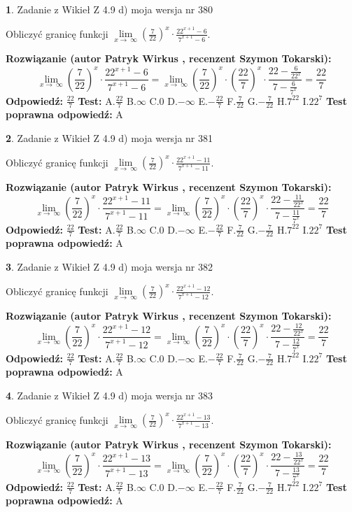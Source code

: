 \documentclass[12pt, a4paper]{article}
\theoremstyle{definition} %
\newtheorem{zad}{}
\newcommand{\zadStart}[1]{\begin{zad}#1\newline}
\newcommand{\zadStop}{\end{zad}}
\newcommand{\rozwStart}[2]{\noindent \textbf{Rozwiązanie (autor #1 , recenzent #2): }\newline}
\newcommand{\rozwStop}{\newline}
\newcommand{\odpStart}{\noindent \textbf{Odpowiedź:}\newline}
\newcommand{\odpStop}{\newline}
\newcommand{\testStart}{\noindent \textbf{Test:}\newline}
\newcommand{\testStop}{\newline}
\newcommand{\kluczStart}{\noindent \textbf{Test poprawna odpowiedź:}\newline}
\newcommand{\kluczStop}{\newline}
\begin{document}
\zadStart{Zadanie z Wikieł Z 4.9 d) moja wersja nr 380}


Obliczyć granicę funkcji  $\lim\limits_{x\to\ \infty}(\frac{7}{22})^{x}\cdot\frac{22^{x+1}-6}{7^{x+1}-6}$.
\zadStop
\rozwStart{Patryk Wirkus}{Szymon Tokarski}
$$\lim\limits_{x\to\ \infty}(\frac{7}{22})^{x}\cdot\frac{22^{x+1}-6}{7^{x+1}-6}=\lim\limits_{x\to\ \infty}(\frac{7}{22})^{x}\cdot(\frac{22}{7})^{x} \cdot \frac{22-\frac{6}{22^{x}}}{7-\frac{6}{7^{x}}} = \frac{22}{7}$$
\rozwStop
\odpStart
$\frac{22}{7}$
\odpStop
\testStart
A.$\frac{22}{7}$ B.$\infty$ C.$0$ D.$-\infty$ E.$-\frac{22}{7}$
F.$\frac{7}{22}$ G.$-\frac{7}{22}$
H.$7^{22}$
I.$22^{7}$
\testStop
\kluczStart
A
\kluczStop



\zadStart{Zadanie z Wikieł Z 4.9 d) moja wersja nr 381}


Obliczyć granicę funkcji  $\lim\limits_{x\to\ \infty}(\frac{7}{22})^{x}\cdot\frac{22^{x+1}-11}{7^{x+1}-11}$.
\zadStop
\rozwStart{Patryk Wirkus}{Szymon Tokarski}
$$\lim\limits_{x\to\ \infty}(\frac{7}{22})^{x}\cdot\frac{22^{x+1}-11}{7^{x+1}-11}=\lim\limits_{x\to\ \infty}(\frac{7}{22})^{x}\cdot(\frac{22}{7})^{x} \cdot \frac{22-\frac{11}{22^{x}}}{7-\frac{11}{7^{x}}} = \frac{22}{7}$$
\rozwStop
\odpStart
$\frac{22}{7}$
\odpStop
\testStart
A.$\frac{22}{7}$ B.$\infty$ C.$0$ D.$-\infty$ E.$-\frac{22}{7}$
F.$\frac{7}{22}$ G.$-\frac{7}{22}$
H.$7^{22}$
I.$22^{7}$
\testStop
\kluczStart
A
\kluczStop



\zadStart{Zadanie z Wikieł Z 4.9 d) moja wersja nr 382}


Obliczyć granicę funkcji  $\lim\limits_{x\to\ \infty}(\frac{7}{22})^{x}\cdot\frac{22^{x+1}-12}{7^{x+1}-12}$.
\zadStop
\rozwStart{Patryk Wirkus}{Szymon Tokarski}
$$\lim\limits_{x\to\ \infty}(\frac{7}{22})^{x}\cdot\frac{22^{x+1}-12}{7^{x+1}-12}=\lim\limits_{x\to\ \infty}(\frac{7}{22})^{x}\cdot(\frac{22}{7})^{x} \cdot \frac{22-\frac{12}{22^{x}}}{7-\frac{12}{7^{x}}} = \frac{22}{7}$$
\rozwStop
\odpStart
$\frac{22}{7}$
\odpStop
\testStart
A.$\frac{22}{7}$ B.$\infty$ C.$0$ D.$-\infty$ E.$-\frac{22}{7}$
F.$\frac{7}{22}$ G.$-\frac{7}{22}$
H.$7^{22}$
I.$22^{7}$
\testStop
\kluczStart
A
\kluczStop



\zadStart{Zadanie z Wikieł Z 4.9 d) moja wersja nr 383}


Obliczyć granicę funkcji  $\lim\limits_{x\to\ \infty}(\frac{7}{22})^{x}\cdot\frac{22^{x+1}-13}{7^{x+1}-13}$.
\zadStop
\rozwStart{Patryk Wirkus}{Szymon Tokarski}
$$\lim\limits_{x\to\ \infty}(\frac{7}{22})^{x}\cdot\frac{22^{x+1}-13}{7^{x+1}-13}=\lim\limits_{x\to\ \infty}(\frac{7}{22})^{x}\cdot(\frac{22}{7})^{x} \cdot \frac{22-\frac{13}{22^{x}}}{7-\frac{13}{7^{x}}} = \frac{22}{7}$$
\rozwStop
\odpStart
$\frac{22}{7}$
\odpStop
\testStart
A.$\frac{22}{7}$ B.$\infty$ C.$0$ D.$-\infty$ E.$-\frac{22}{7}$
F.$\frac{7}{22}$ G.$-\frac{7}{22}$
H.$7^{22}$
I.$22^{7}$
\testStop
\kluczStart
A
\kluczStop
\end{document}

